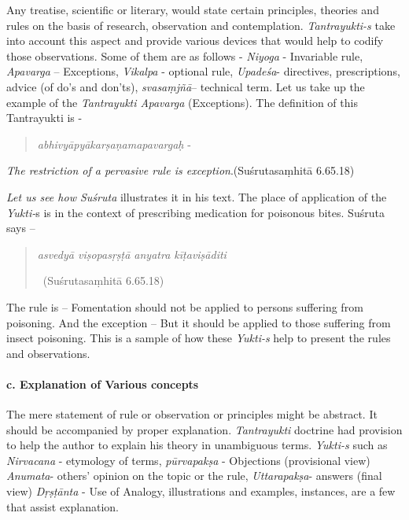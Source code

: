 Any treatise, scientific or literary, would state certain principles, theories and rules on the basis of research, observation and contemplation. \textit{Tantrayukti-s} take into account this aspect and provide various devices that would help to codify those observations. Some of them are as follows - \textit{Niyoga} - Invariable rule, \textit{Apavarga} – Exceptions, \textit{Vikalpa} - optional rule, \textit{Upadeśa}- directives, prescriptions, advice (of do’s and don’ts), \textit{svasaṃjñā}– technical term. Let us take up the example of the \textit{Tantrayukti Apavarga} (Exceptions). The definition of this Tantrayukti is -

\begin{verse}
\textit{abhivyāpyākarṣaṇamapavargaḥ} -
\end{verse}

\begin{myquote}
\textit{The restriction of a pervasive rule is exception}.\hfill (Suśrutasaṃhitā 6.65.18)
\end{myquote}

\textit{Let us see how Suśruta} illustrates it in his text. The place of application of the \textit{Yukti-}s is in the context of prescribing medication for poisonous bites. Suśruta says –

\begin{verse}
\textit{asvedyā viṣopasṛṣṭā anyatra kīṭaviṣāditi}

~\hfill (Suśrutasaṃhitā 6.65.18)
\end{verse}

The rule is – Fomentation should not be applied to persons suffering from poisoning. And the exception – But it should be applied to those suffering from insect poisoning. This is a sample of how these \textit{Yukti-s} help to present the rules and observations.


\paragraph*{c. Explanation of Various concepts}

The mere statement of rule or observation or principles might be abstract. It should be accompanied by proper explanation. \textit{Tantrayukti} doctrine had provision to help the author to explain his theory in unambiguous terms. \textit{Yukti-s} such as \textit{Nirvacana} - etymology of terms, \textit{pūrvapakṣa} - Objections (provisional view) \textit{Anumata}- others’ opinion on the topic or the rule, \textit{Uttarapakṣa}- answers (final view) \textit{Dṛṣṭānta} - Use of Analogy, illustrations and examples, instances, are a few that assist explanation.

